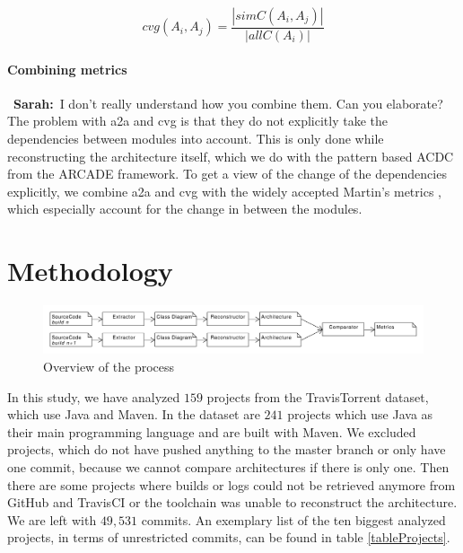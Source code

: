 \documentclass[sigplan, anonymous, review]{acmart}
\newcommand{\sn}[1]{{\color{blue}\textbf{Sarah:}~#1}}
\begin{document}
\begin{equation} \label{eq:cvg}
cvg(A_i, A_j) = \frac{|simC(A_i, A_j)|}{|allC(A_i)|}
\end{equation}

\paragraph{Combining metrics} 
~\sn{I don't really understand how you combine them. Can you elaborate?}
The problem with a2a and cvg is that they do not explicitly take the dependencies between modules into account. This is only done while reconstructing the architecture itself, which we do with the pattern based ACDC from the ARCADE framework. 
To get a view of the change of the dependencies explicitly, we combine a2a and cvg with the widely accepted Martin's metrics \cite{Val-MartinsMet}, which especially account for the change in between the modules. 

\section{Methodology}

\begin{figure}[!t]
	\centering
	\includegraphics[width=7in]{assets/overview.pdf}
	\caption{Overview of the process}
	\label{overview}
\end{figure}



In this study, we have analyzed $159$ projects from the TravisTorrent dataset, which use Java and Maven. In the dataset are $241$ projects which use Java as their main programming language and are built with Maven. We excluded projects, which do not have pushed anything to the master branch or only have one commit, because we cannot compare architectures if there is only one. Then there are some projects where builds or logs could not be retrieved anymore from GitHub and TravisCI or the toolchain was unable to reconstruct the architecture. We are left with $49,531$ commits. An exemplary list of the ten biggest analyzed projects, in terms of unrestricted commits, can be found in table \ref{tableProjects}.
\end{document}
